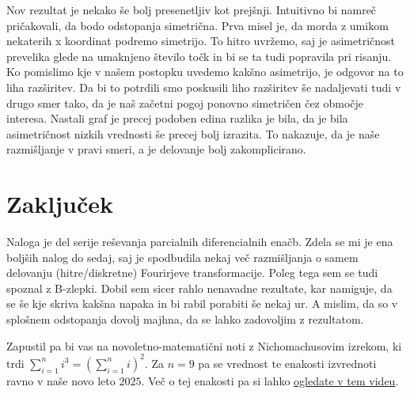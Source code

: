 \documentclass{article}
\begin{document}
Nov rezultat je nekako še bolj presenetljiv kot prejšnji. Intuitivno bi namreč pričakovali, da bodo odstopanja simetrična. Prva misel je, da morda z umikom nekaterih x koordinat podremo simetrijo. To hitro uvržemo, saj je asimetričnost prevelika glede na umaknjeno število točk in bi se ta tudi popravila pri risanju. Ko pomislimo kje v našem postopku uvedemo kakšno asimetrijo, je odgovor na to liha razširitev. Da bi to potrdili smo poskusili liho razširitev še nadaljevati tudi v drugo smer tako, da je naš začetni pogoj ponovno simetričen čez območje interesa. Nastali graf je precej podoben edina razlika je bila, da je bila asimetričnost nizkih vrednosti še precej bolj izrazita. To nakazuje, da je naše razmišljanje v pravi smeri, a je delovanje bolj zakomplicirano. 
\section{Zaključek}
Naloga je del serije reševanja parcialnih diferencialnih enačb. Zdela se mi je ena boljših nalog do sedaj, saj je spodbudila nekaj več razmišljanja o samem delovanju (hitre/diskretne) Fourirjeve transformacije. Poleg tega sem se tudi spoznal z B-zlepki. Dobil sem sicer rahlo nenavadne rezultate, kar namiguje, da se še kje skriva kakšna napaka in bi rabil porabiti še nekaj ur. A mislim, da so v splošnem odstopanja dovolj majhna, da se lahko zadovoljim z rezultatom.

\smallskip

Zapustil pa bi vas na novoletno-matematični noti z Nichomachusovim izrekom, ki trdi $\sum_{i=1}^{n} i^3 = \left(\sum_{i=1}^{n} i\right)^2$. Za $n=9$ pa se vrednost te enakosti izvrednoti ravno v naše novo leto $2025$. Več o tej enakosti pa si lahko \href{https://www.youtube.com/watch?v=ZWLkIW4NsQ0}{ogledate v tem videu}.
\end{document}
